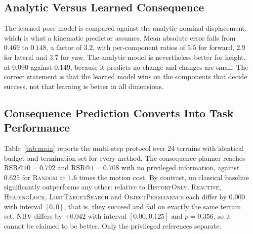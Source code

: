 \documentclass[conference]{IEEEtran}
\begin{document}
\subsection{Analytic Versus Learned Consequence}

The learned pose model is compared against the analytic nominal displacement, which is
what a kinematic predictor assumes. Mean absolute error falls from $0.469$ to
$0.148$, a factor of $3.2$, with per-component ratios of $5.5$ for forward, $2.9$ for
lateral and $3.7$ for yaw. The analytic model is nevertheless better for height, at
$0.090$ against $0.149$, because it predicts no change and changes are small. The
correct statement is that the learned model wins on the components that decide
success, not that learning is better in all dimensions.

\subsection{Consequence Prediction Converts Into Task Performance}

Table~\ref{tab:main} reports the multi-step protocol over 24 terrains with identical
budget and termination set for every method. The consequence planner reaches
$\mathrm{RSR}@10 = 0.792$ and $\mathrm{RSR}@1 = 0.708$ with no privileged information,
against $0.625$ for \textsc{Random} at $1.6$ times the motion cost. By contrast, no
classical baseline significantly outperforms any other: relative to
\textsc{HistoryOnly}, \textsc{Reactive}, \textsc{HeadingLock},
\textsc{LostTargetSearch} and \textsc{ObjectPermanence} each differ by $0.000$ with
interval $[0,0]$, that is, they succeed and fail on exactly the same terrain set.
\textsc{NBV} differs by $+0.042$ with interval $[0.00, 0.125]$ and $p = 0.356$, so it
cannot be claimed to be better. Only the privileged references separate.
\end{document}
